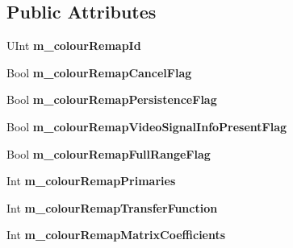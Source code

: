 \subsection*{Public Attributes}
\begin{DoxyCompactItemize}
\item 
\mbox{\label{class_s_e_i_colour_remapping_info_a9fac3fe48598b63f3dcba1e20fae9575}} 
U\+Int {\bfseries m\+\_\+colour\+Remap\+Id}
\item 
\mbox{\label{class_s_e_i_colour_remapping_info_a576a297b74f9942ea0ef31034bea80d5}} 
Bool {\bfseries m\+\_\+colour\+Remap\+Cancel\+Flag}
\item 
\mbox{\label{class_s_e_i_colour_remapping_info_a68d6f1053bb0c70b87467aa0ef981f95}} 
Bool {\bfseries m\+\_\+colour\+Remap\+Persistence\+Flag}
\item 
\mbox{\label{class_s_e_i_colour_remapping_info_a36dceb0cc6490eec0333a31461fa363f}} 
Bool {\bfseries m\+\_\+colour\+Remap\+Video\+Signal\+Info\+Present\+Flag}
\item 
\mbox{\label{class_s_e_i_colour_remapping_info_a41abb75808ea39994c6c94944cf4df02}} 
Bool {\bfseries m\+\_\+colour\+Remap\+Full\+Range\+Flag}
\item 
\mbox{\label{class_s_e_i_colour_remapping_info_a5a36f7f9313dd357b5e277cfb6c1ac87}} 
Int {\bfseries m\+\_\+colour\+Remap\+Primaries}
\item 
\mbox{\label{class_s_e_i_colour_remapping_info_a870908eff34d150df3b123940464d543}} 
Int {\bfseries m\+\_\+colour\+Remap\+Transfer\+Function}
\item 
\mbox{\label{class_s_e_i_colour_remapping_info_ad90c0ecd28cdd677af69a31c1ecef676}} 
Int {\bfseries m\+\_\+colour\+Remap\+Matrix\+Coefficients}
\item 
\mbox{\label{class_s_e_i_colour_remapping_info_a1217eeda042dd953fd6ddac1757e5eb7}} 

\end{DoxyCompactItemize}
